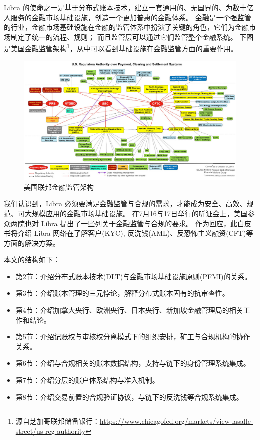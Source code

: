 Libra 的使命之一是基于分布式账本技术，建立一套通用的、无国界的、为数十亿人服务的金融市场基础设施，创造一个更加普惠的金融体系。
金融是一个强监管的行业，金融市场基础设施在金融的监管体系中扮演了关键的角色，它们为金融市场制定了统一的流程、规则；
而且监管层可以通过它们监管整个金融系统。
下图是美国金融监管架构\footnote{源自芝加哥联邦储备银行：\url{https://www.chicagofed.org/markets/view-lasalle-street/us-reg-authority}}，从中可以看到基础设施在金融监管方面的重要作用。

\begin{figure}[h!]
    \centering
    \includegraphics[width=12cm, keepaspectratio]{images/regulatory-over-PCS.jpg}
    \caption{美国联邦金融监管架构}
    \label{fig:USAReg}
\end{figure}


我们认识到，Libra 必须要满足金融监管与合规的需求，才能成为安全、高效、规范、可大规模应用的金融市场基础设施。
在7月16与17日举行的听证会上，美国参众两院也对 Libra 提出了一些列关于金融监管与合规的要求。
作为回应，此白皮书将介绍 Libra 网络在了解客户(KYC), 反洗钱(AML)、反恐怖主义融资(CFT)等方面的解决方案。

本文的结构如下：
\begin{itemize}
    \item[] 第2节：介绍分布式账本技术(DLT)与金融市场基础设施原则(PFMI)的关系。
    \item[] 第3节：介绍账本管理的三元悖论，解释分布式账本固有的抗审查性。
    \item[] 第4节：介绍加拿大央行、欧洲央行、日本央行、新加坡金融管理局的相关工作和结论。
    \item[] 第5节：介绍记账权与审核权分离模式下的组织安排，矿工与合规机构的协作关系。
    \item[] 第6节：介绍与合规相关的账本数据结构，支持与链下的身份管理系统集成。
    \item[] 第7节：介绍分层的账户体系结构与准入机制。
    \item[] 第8节：介绍交易前置的合规验证协议，与链下的反洗钱等合规系统集成。
\end{itemize}



